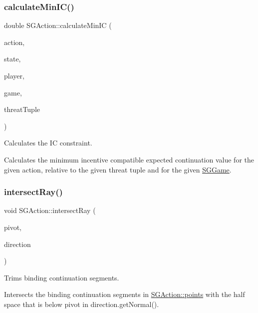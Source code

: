 \subsubsection{\texorpdfstring{calculate\+Min\+I\+C()}{calculateMinIC()}}
{\footnotesize\ttfamily double S\+G\+Action\+::calculate\+Min\+IC (\begin{DoxyParamCaption}\item[{int}]{action,  }\item[{int}]{state,  }\item[{int}]{player,  }\item[{const \hyperlink{classSGGame}{S\+G\+Game} \&}]{game,  }\item[{const \hyperlink{classSGTuple}{S\+G\+Tuple} \&}]{threat\+Tuple }\end{DoxyParamCaption})\hspace{0.3cm}{\ttfamily [static]}}



Calculates the IC constraint. 

Calculates the minimum incentive compatible expected continuation value for the given action, relative to the given threat tuple and for the given \hyperlink{classSGGame}{S\+G\+Game}. \mbox{\label{classSGAction_a7ecafdb0cf42f83931f923f2e4e23f25}} 
\subsubsection{\texorpdfstring{intersect\+Ray()}{intersectRay()}}
{\footnotesize\ttfamily void S\+G\+Action\+::intersect\+Ray (\begin{DoxyParamCaption}\item[{const \hyperlink{classSGPoint}{S\+G\+Point} \&}]{pivot,  }\item[{const \hyperlink{classSGPoint}{S\+G\+Point} \&}]{direction }\end{DoxyParamCaption})}



Trims binding continuation segments. 

Intersects the binding continuation segments in \hyperlink{classSGBaseAction_a4d200e71f5bcfad3fe039293e90dbd70}{S\+G\+Action\+::points} with the half space that is below pivot in direction.\+get\+Normal(). \mbox{\label{classSGAction_ae78f31d121e131788ac4c767e01d012c}} 
